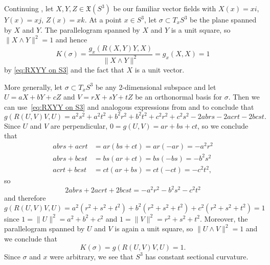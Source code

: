 \begin{example}\label{ex:sectional curvature on S^3}
	Continuing , let $X,Y,Z \in \mathfrak{X}(S^3)$ be our familiar vector fields with $X(x) = xi$, $Y(x) = xj$, $Z(x) = xk$. At a point $x \in S^3$, let $\sigma \subset T_x S^3$ be the plane spanned by $X$ and $Y$. The parallelogram spanned by $X$ and $Y$ is a unit square, so $\|X \wedge Y\|^2 = 1$ and hence
	\[
		K(\sigma) = \frac{g_x(R(X,Y)Y,X)}{\|X \wedge Y\|^2} = g_x(X,X) = 1
	\]
	by \eqref{eq:RXYY on S3} and the fact that $X$ is a unit vector.
	
	More generally, let $\sigma \subset T_xS^3$ be any 2-dimensional subspace and let $U = aX+bY+cZ$ and $V = rX+sY+tZ$ be an orthonormal basis for $\sigma$. Then we can use~\eqref{eq:RXYY on S3} and analogous expressions from  and  to conclude that
	\[
		g(R(U,V)V,U) = a^2s^2+a^2t^2+b^2r^2+b^2t^2+c^2r^2+c^2s^2-2abrs-2acrt-2bcst.
	\]
	Since $U$ and $V$ are perpendicular, $0=g(U,V) = ar+bs+ct$, so we conclude that
	\begin{align*}
		abrs + acrt & = ar(bs+ct) = ar(-ar) = -a^2r^2 \\
		abrs+bcst & = bs(ar+ct) = bs(-bs) = -b^2s^2 \\
		acrt+bcst & = ct(ar+bs) = ct(-ct) = -c^2t^2,
	\end{align*}
	so
	\[
		2abrs+2acrt+2bcst = -a^2r^2-b^2s^2-c^2t^2
	\]
	and therefore
	\[
		g(R(U,V)V,U) = a^2(r^2+s^2+t^2)+ b^2(r^2+s^2+t^2) + c^2(r^2+s^2+t^2) = 1
	\]
	since $1 = \|U\|^2 = a^2+b^2+c^2$ and $1 = \|V\|^2 = r^2+s^2+t^2$. Moreover, the parallelogram spanned by $U$ and $V$ is again a unit square, so $\|U \wedge V\|^2 = 1$ and we conclude that
	\[
		K(\sigma) = g(R(U,V)V,U) = 1.
	\]
	Since $\sigma$ and $x$ were arbitrary, we see that $S^3$ has constant sectional curvature.
\end{example}

